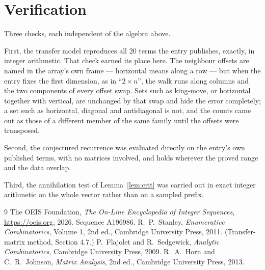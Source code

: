 \documentclass[11pt,a4paper]{article}
\theoremstyle{plain}
\theoremstyle{definition}
\begin{document}
\section{Verification}

Three checks, each independent of the algebra above.

First, the transfer model reproduces all $20$ terms the entry publishes, exactly, in
integer arithmetic. That check earned its place here. The neighbour offsets are named in the
array's own frame --- horizontal means along a row --- but when the entry fixes the first
dimension, as in ``$2\times n$'', the walk runs along columns and the two components of every
offset swap. Sets such as king-move, or horizontal together with vertical, are unchanged by
that swap and hide the error completely; a set such as horizontal, diagonal and antidiagonal
is not, and the counts came out as those of a different member of the same family until the
offsets were transposed.

Second, the conjectured recurrence was evaluated directly on the entry's own published terms,
with no matrices involved, and holds wherever the proved range and the data overlap.

Third, the annihilation test of Lemma~\ref{lem:crit} was carried out in exact integer
arithmetic on the whole vector rather than on a sampled prefix.

\begin{thebibliography}{9}
 The OEIS Foundation, \emph{The On-Line Encyclopedia of Integer
Sequences}, \url{https://oeis.org}, 2026. Sequence A196986.
 R.~P.~Stanley, \emph{Enumerative Combinatorics}, Volume 1, 2nd ed.,
Cambridge University Press, 2011. (Transfer-matrix method, Section 4.7.)
 P.~Flajolet and R.~Sedgewick, \emph{Analytic Combinatorics}, Cambridge
University Press, 2009.
 R.~A.~Horn and C.~R.~Johnson, \emph{Matrix Analysis}, 2nd ed., Cambridge
University Press, 2013.
\end{thebibliography}
\end{document}
